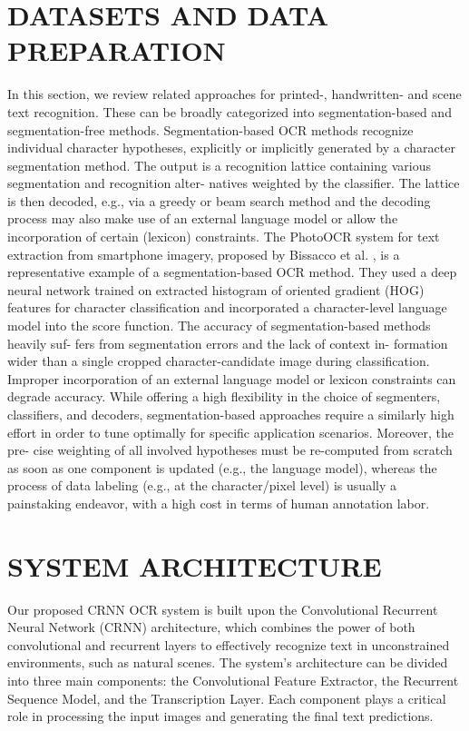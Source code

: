\documentclass[10pt,twocolumn,letterpaper]{article}
\begin{document}
\section{DATASETS AND DATA PREPARATION}
\label{sec:data}
In this section, we review related approaches for printed-,
handwritten- and scene text recognition. These can be broadly
categorized into segmentation-based and segmentation-free
methods.
Segmentation-based OCR methods recognize individual
character hypotheses, explicitly or implicitly generated by a
character segmentation method. The output is a recognition lattice containing various segmentation and recognition alter-
natives weighted by the classifier. The lattice is then decoded,
e.g., via a greedy or beam search method and the decoding
process may also make use of an external language model or
allow the incorporation of certain (lexicon) constraints.
The PhotoOCR system for text extraction from smartphone
imagery, proposed by Bissacco et al. , is a representative
example of a segmentation-based OCR method. They used
a deep neural network trained on extracted histogram of
oriented gradient (HOG) features for character classification
and incorporated a character-level language model into the
score function.
The accuracy of segmentation-based methods heavily suf-
fers from segmentation errors and the lack of context in-
formation wider than a single cropped character-candidate
image during classification. Improper incorporation of an
external language model or lexicon constraints can degrade
accuracy. While offering a high flexibility in the choice
of segmenters, classifiers, and decoders, segmentation-based
approaches require a similarly high effort in order to tune
optimally for specific application scenarios. Moreover, the pre-
cise weighting of all involved hypotheses must be re-computed
from scratch as soon as one component is updated (e.g., the
language model), whereas the process of data labeling (e.g.,
at the character/pixel level) is usually a painstaking endeavor,
with a high cost in terms of human annotation labor.

\section{SYSTEM ARCHITECTURE}
\label{sec:formatting}

Our proposed CRNN OCR system is built upon the Convolutional Recurrent Neural Network (CRNN) architecture, which combines the power of both convolutional and recurrent layers to effectively recognize text in unconstrained environments, such as natural scenes. The system's architecture can be divided into three main components: the Convolutional Feature Extractor, the Recurrent Sequence Model, and the Transcription Layer. Each component plays a critical role in processing the input images and generating the final text predictions.
\end{document}
